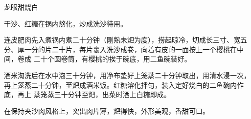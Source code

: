 %
%
%
%
%
%
%
\begin{recipe}{龙眼甜烧白}

\ingredients


\preparation

\step 干沙、红糖在锅内熬化，炒成洗沙待用。

\step 连皮肥肉先入煮锅内煮二十分钟（刚熟未𤆵为度），捞起晾冷，切成长三寸、宽五
分、厚一分的片二十片，每片裹入洗沙成卷，向着有皮的一面按上一个樱桃在中间，卷成
二十个圆卷筒，有樱桃的挨于碗底，用二鱼碗装好。

\step 酒米淘洗后在水中泡三十分钟，用净布垫好上笼蒸二十分钟取出，用清水浸一次，
再上笼蒸二十分钟，至𤆵成酒米饭。红糖溶化拌匀，装入定好烧白的二鱼碗内作底，再上
蒸笼蒸三十分钟至𤆵，出菜时洒上白糖即成。

\features

在保持夹沙肉风格上，突出肉片薄，𤆵得快，外形美观，香甜可口。

\end{recipe}

